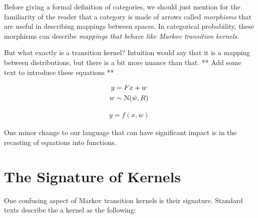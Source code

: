 Before giving a formal definition of categories, we should just mention for the familiarity of the reader that a category is made of arrows called \emph{morphisms} that are useful in describing mappings between spaces. In categorical probability, these morphisms can describe \emph{mappings that behave like Markov transition kernels}.

But what exactly is a transition kernel?
Intuition would say that it is a mapping between distributions, but there is a bit more nuance than that. ** Add some text to introduce these equations **


\begin{equation}
\label{traditional-gaussian-model}
\begin{gathered}
    y = Fx + w \\
    w \sim \mathcal{N}(\bar{w}, R)
\end{gathered}
\end{equation}

\begin{equation}
    \begin{aligned}
	y = f(x,w)
    \end{aligned}
\end{equation}

One minor change to our language that can have significant impact is in the recasting of equations into functions.

\section{The Signature of Kernels}
\label{sec:kernel-signature}

One confusing aspect of Markov transition kernels is their signature. 
Standard texts describe the a kernel as the following:

